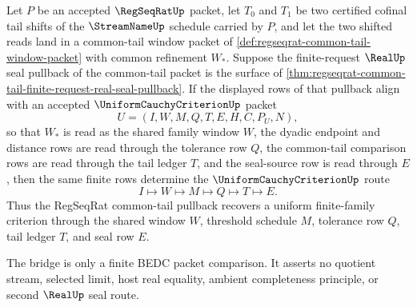 \begin{theorem}
\label{thm:uniform-cauchy-criterion-common-tail-uniform-criterion-bridge}
Let $P$ be an accepted $\RegSeqRatUp$ packet, let $T_0$ and $T_1$ be two certified cofinal tail shifts of the $\StreamNameUp$ schedule carried by $P$, and let the two shifted reads land in a common-tail window packet of \autoref{def:regseqrat-common-tail-window-packet} with common refinement $W_\ast$. Suppose the finite-request $\RealUp$ seal pullback of the common-tail packet is the surface of \autoref{thm:regseqrat-common-tail-finite-request-real-seal-pullback}. If the displayed rows of that pullback align with an accepted $\UniformCauchyCriterionUp$ packet
$$
U=(I,W,M,Q,T,E,H,C,P_U,N),
$$
so that $W_\ast$ is read as the shared family window $W$, the dyadic endpoint and distance rows are read through the tolerance row $Q$, the common-tail comparison rows are read through the tail ledger $T$, and the seal-source row is read through $E$, then the same finite rows determine the $\UniformCauchyCriterionUp$ route
$$
I \longmapsto W \longmapsto M \longmapsto Q \longmapsto T \longmapsto E.
$$
Thus the RegSeqRat common-tail pullback recovers a uniform finite-family criterion through the shared window $W$, threshold schedule $M$, tolerance row $Q$, tail ledger $T$, and seal row $E$.

The bridge is only a finite BEDC packet comparison. It asserts no quotient stream, selected limit, host real equality, ambient completeness principle, or second $\RealUp$ seal route.
\end{theorem}
